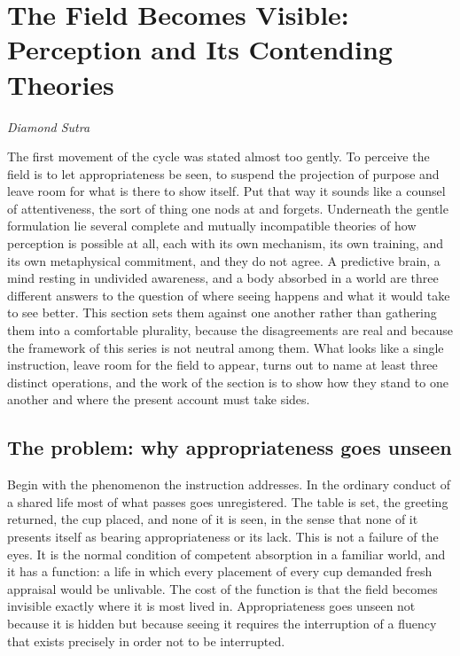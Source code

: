 \section{The Field Becomes Visible: Perception and Its Contending Theories}
\label{p22:sec:perception-field}

\epigraph{}{\textit{Diamond Sutra}}

\noindent
The first movement of the cycle was stated almost too gently. To perceive the field is to let appropriateness be seen, to suspend the projection of purpose and leave room for what is there to show itself. Put that way it sounds like a counsel of attentiveness, the sort of thing one nods at and forgets. Underneath the gentle formulation lie several complete and mutually incompatible theories of how perception is possible at all, each with its own mechanism, its own training, and its own metaphysical commitment, and they do not agree. A predictive brain, a mind resting in undivided awareness, and a body absorbed in a world are three different answers to the question of where seeing happens and what it would take to see better. This section sets them against one another rather than gathering them into a comfortable plurality, because the disagreements are real and because the framework of this series is not neutral among them. What looks like a single instruction, leave room for the field to appear, turns out to name at least three distinct operations, and the work of the section is to show how they stand to one another and where the present account must take sides.

\subsection{The problem: why appropriateness goes unseen}
\label{p22:sub:perception-problem}

Begin with the phenomenon the instruction addresses. In the ordinary conduct of a shared life most of what passes goes unregistered. The table is set, the greeting returned, the cup placed, and none of it is seen, in the sense that none of it presents itself as bearing appropriateness or its lack. This is not a failure of the eyes. It is the normal condition of competent absorption in a familiar world, and it has a function: a life in which every placement of every cup demanded fresh appraisal would be unlivable. The cost of the function is that the field becomes invisible exactly where it is most lived in. Appropriateness goes unseen not because it is hidden but because seeing it requires the interruption of a fluency that exists precisely in order not to be interrupted.

